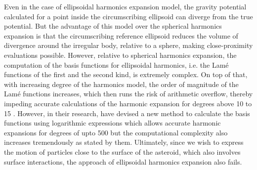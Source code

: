 %
\newline\newline
%
Even in the case of ellipsoidal harmonics expansion model, the gravity potential calculated for a point inside the circumscribing ellipsoid can diverge from the true potential. But the advantage of this model over the spherical harmonics expansion is that the circumscribing reference ellipsoid reduces the volume of divergence around the irregular body, relative to a sphere, making close-proximity evaluations possible. However, relative to spherical harmonics expansion, the computation of the basis functions for ellipsoidal harmonics, i.e. the Lam\'e functions of the first and the second kind, is extremely complex. On top of that, with increasing degree of the harmonics model, the order of magnitude of the Lam\'e functions increases, which then runs the risk of arithmetic overflow, thereby impeding accurate calculations of the harmonic expansion for degrees above 10 to 15 \parencite{reimond2016spheroidal}. However, in their research, \cite{reimond2016spheroidal} have devised a new method to calculate the basis functions using logarithmic expressions which allows accurate harmonic expansions for degrees of upto 500 but the computational complexity also increases tremendously as stated by them. Ultimately, since we wish to express the motion of particles close to the surface of the asteroid, which also involves surface interactions, the approach of ellipsoidal harmonics expansion also fails.

